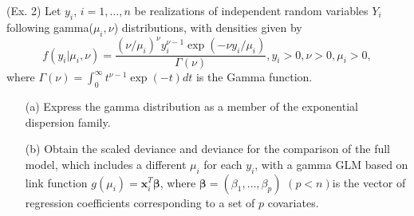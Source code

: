 \documentclass[]{article}
\begin{document}
\begin{enumerate}
{\item (Ex. 2)
Let $y_i$, $i = 1,\ldots,n$ be realizations of independent random variables $Y_i$ following gamma($\mu_i,\nu$) distributions, with densities given by
\begin{equation*}
f(y_i|\mu_i,\nu) = \frac{(\nu/\mu_i)^\nu y_i^{\nu-1}\exp(-\nu y_i/\mu_i)}{\Gamma(\nu)}, y_i>0, \nu>0, \mu_i>0,
\end{equation*}
where $\Gamma(\nu) = \int_0^{\infty} t^{\nu-1}\exp(-t)dt$ is the Gamma function.
\begin{itemize}
	\item[(a)] Express the gamma distribution as a member of the exponential dispersion family.
	\item[(b)] Obtain the scaled deviance and deviance for the comparison of the full model, which includes a different $\mu_i$ for each $y_i$, with a gamma GLM based on link function $g(\mu_i) = \bm{x}_i^T\bm{\beta}$, where $\bm{\beta} = (\beta_1,\ldots,\beta_p)$ $(p<n)$is the vector of regression coefficients corresponding to a set of $p$ covariates.
\end{itemize}

}
\end{enumerate}
\end{document}
